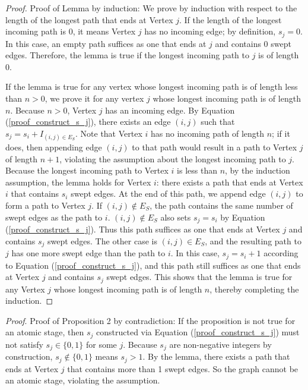 \documentclass[review]{siamart0216}
\begin{document}
    \begin{proof}
Proof of Lemma by induction:
We prove by induction with respect to the length of the longest path that
ends at Vertex $j$.  If the length of the longest incoming path is 0,
it means Vertex $j$ has no incoming edge; by definition, $s_j=0$.
In this case, an empty path suffices
as one that ends at $j$ and contains $0$ swept edges.  Therefore, the lemma
is true if the longest incoming path to $j$ is of length 0.

If the lemma is true for any vertex whose longest incoming path is of length
less than $n>0$, we prove it for any vertex $j$ whose longest incoming path
is of length $n$.  Because $n>0$, Vertex $j$ has an incoming edge.
By Equation (\ref{proof_construct_s_j}), there exists an edge $(i,j)$ such that
$s_j = s_i + I_{(i,j)\in E_S}$.  Note that Vertex $i$ has no incoming path
of length $n$; if it does, then appending edge $(i,j)$ to that path would
result in a path to Vertex $j$ of length $n+1$, violating the assumption
about the longest incoming path to $j$.  Because the longest
incoming path to Vertex $i$ is less than $n$, by the induction assumption,
the lemma holds for Vertex $i$:
there exists a path that ends at Vertex $i$ that contains $s_i$ swept edges.
At the end of this path, we append edge $(i,j)$ to form a path to Vertex
$j$.  If $(i,j)\notin E_S$, the path contains the same number of swept edges
as the path to $i$.  $(i,j)\notin E_S$ also sets $s_j=s_i$
by Equation (\ref{proof_construct_s_j}).
Thus this path suffices as one that ends at Vertex $j$ and contains $s_j$
swept edges.  The other case is $(i,j)\in E_S$,
and the resulting path to $j$ has one more swept edge than the path to $i$.
In this case, $s_j=s_i+1$ according to Equation (\ref{proof_construct_s_j}),
and this path still suffices as one that ends at Vertex $j$ and contains $s_j$
swept edges.  This shows that the lemma is true for any Vertex $j$ whose
longest incoming path is of length $n$, thereby completing the induction.
    \end{proof}

    {\em Proof}.
Proof of Proposition 2 by contradiction:
If the proposition is not true for an atomic stage,
then $s_j$ constructed via Equation 
(\ref{proof_construct_s_j}) must not satisfy $s_j\in \{0,1\}$ for some $j$.
Because $s_j$ are non-negative integers by construction, 
$s_j\notin \{0,1\}$ means $s_j>1$.  By the lemma, there exists a path that
ends at Vertex $j$ that contains more than 1 swept edges. So the graph
cannot be an atomic stage, violating the assumption. \qquad\endproof 
\end{document}
